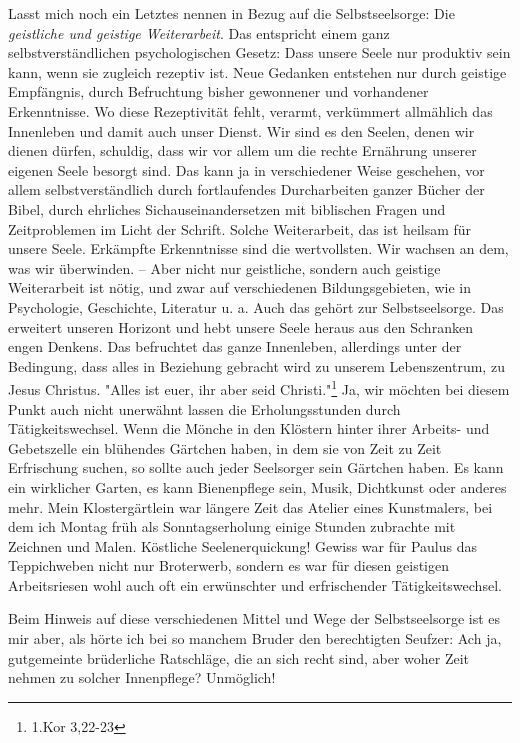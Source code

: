 \documentclass[a5paper,openany]{book}
\begin{document}
Lasst mich noch ein Letztes nennen in Bezug auf die Selbstseelsorge: Die \emph{geistliche und geistige Weiterarbeit}. Das entspricht einem ganz selbstverständlichen psychologischen Gesetz: Dass unsere Seele nur produktiv sein kann, wenn sie zugleich rezeptiv ist. Neue Gedanken entstehen nur durch geistige Empfängnis, durch Befruchtung bisher gewonnener und vorhandener Erkenntnisse. Wo diese Rezeptivität fehlt, verarmt, verkümmert allmählich das Innenleben und damit auch unser Dienst. Wir sind es den Seelen, denen wir dienen dürfen, schuldig, dass wir vor allem um die rechte Ernährung unserer eigenen Seele besorgt sind. Das kann ja in verschiedener Weise geschehen, vor allem selbstverständlich durch fortlaufendes Durcharbeiten ganzer Bücher der Bibel, durch ehrliches Sichauseinandersetzen mit biblischen Fragen und Zeitproblemen im Licht der Schrift. Solche Weiterarbeit, das ist heilsam für unsere Seele. Erkämpfte Erkenntnisse sind die wertvollsten. Wir wachsen an dem, was wir überwinden. – Aber nicht nur geistliche, sondern auch geistige Weiterarbeit ist nötig, und zwar auf verschiedenen Bildungsgebieten, wie in Psychologie, Geschichte, Literatur u. a. Auch das gehört zur Selbstseelsorge. Das erweitert unseren Horizont und hebt unsere Seele heraus aus den Schranken engen Denkens. Das befruchtet das ganze Innenleben, allerdings unter der Bedingung, dass alles in Beziehung gebracht wird zu unserem Lebenszentrum, zu Jesus Christus. "Alles ist euer, ihr aber seid Christi."\footnote{1.Kor 3,22-23} Ja, wir möchten bei diesem Punkt auch nicht unerwähnt lassen die Erholungsstunden durch Tätigkeitswechsel. Wenn die Mönche in den Klöstern hinter ihrer Arbeits- und Gebetszelle ein blühendes Gärtchen haben, in dem sie von Zeit zu Zeit Erfrischung suchen, so sollte auch jeder Seelsorger sein Gärtchen haben. Es kann ein wirklicher Garten, es kann Bienenpflege sein, Musik, Dichtkunst oder anderes mehr. Mein Klostergärtlein war längere Zeit das Atelier eines Kunstmalers, bei dem ich Montag früh als Sonntagserholung einige Stunden zubrachte mit Zeichnen und Malen. Köstliche Seelenerquickung! Gewiss  war für Paulus das Teppichweben nicht nur Broterwerb, sondern es war für diesen geistigen Arbeitsriesen wohl auch oft ein erwünschter und erfrischender Tätigkeitswechsel.
\par
Beim Hinweis auf diese verschiedenen Mittel und Wege der Selbstseelsorge ist es mir aber, als hörte ich bei so manchem Bruder den berechtigten Seufzer: Ach ja, gutgemeinte brüderliche Ratschläge, die an sich recht sind, aber woher Zeit nehmen zu solcher Innenpflege? Unmöglich!
\end{document}
